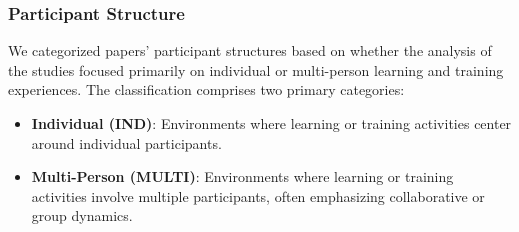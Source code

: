 \documentclass[manuscript,screen,review]{acmart}
\begin{document}




\subsubsection{Participant Structure} \label{subsec:participant_structure}


We categorized papers' participant structures based on whether the analysis of the studies focused primarily on individual or multi-person learning and training experiences. The classification comprises two primary categories: 
\begin{itemize}
    \item \textbf{Individual (IND)}: Environments where learning or training activities center around individual participants.
    \item \textbf{Multi-Person (MULTI)}: Environments where learning or training activities involve multiple participants, often emphasizing collaborative or group dynamics. 
\end{itemize}
\end{document}
